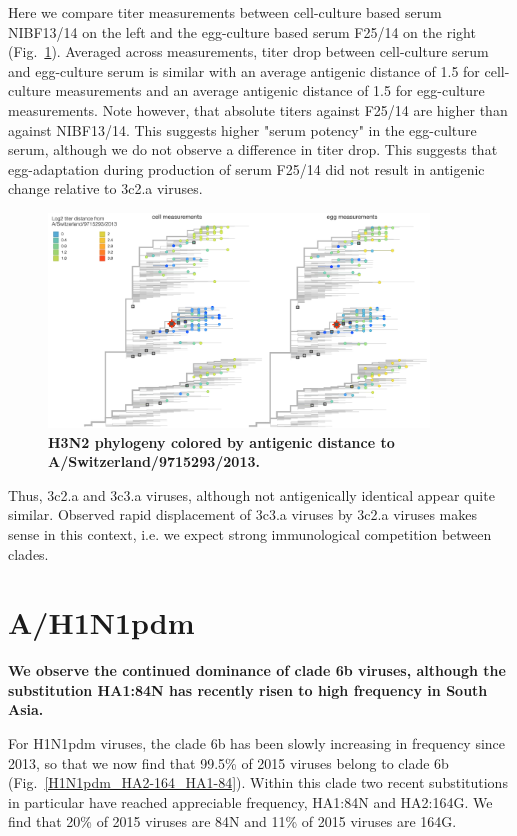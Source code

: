 \documentclass[11pt,oneside,letterpaper]{article}
\begin{document}
Here we compare titer measurements between cell-culture based serum NIBF13/14 on the left and the egg-culture based serum F25/14 on the right (Fig.~\ref{H3N2_HI_titers_ce}). Averaged across measurements, titer drop between cell-culture serum and egg-culture serum is similar with an average antigenic distance of 1.5 for cell-culture measurements and an average antigenic distance of 1.5 for egg-culture measurements. Note however, that absolute titers against F25/14 are higher than against NIBF13/14. This suggests higher "serum potency" in the egg-culture serum, although we do not observe a difference in titer drop. This suggests that egg-adaptation during production of serum F25/14 did not result in antigenic change relative to 3c2.a viruses.

\begin{figure}[h!]
	\centering		
	\includegraphics[width=0.9\textwidth]{../figures/sep-2015/H3N2_HI_titers_ce.png}
	\caption{\textbf{H3N2 phylogeny colored by antigenic distance to A/Switzerland/9715293/2013.} 
	}
	\label{H3N2_HI_titers_ce}
\end{figure}

Thus, 3c2.a and 3c3.a viruses, although not antigenically identical appear quite similar. Observed rapid displacement of 3c3.a viruses by 3c2.a viruses makes sense in this context, i.e. we expect strong immunological competition between clades.

\clearpage
\pagebreak

\section*{A/H1N1pdm}

\textbf{We observe the continued dominance of clade 6b viruses, although the substitution HA1:84N has recently risen to high frequency in South Asia.}

For H1N1pdm viruses, the clade 6b has been slowly increasing in frequency since 2013, so that we now find that 99.5\% of 2015 viruses belong to clade 6b (Fig.~\ref{H1N1pdm_HA2-164_HA1-84}). Within this clade two recent substitutions in particular have reached appreciable frequency, HA1:84N and HA2:164G. We find that 20\% of 2015 viruses are 84N and 11\% of 2015 viruses are 164G.
\end{document}
